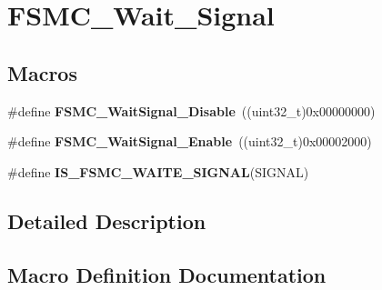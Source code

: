 \hypertarget{group___f_s_m_c___wait___signal}{}\section{F\+S\+M\+C\+\_\+\+Wait\+\_\+\+Signal}
\label{group___f_s_m_c___wait___signal}
\subsection*{Macros}
\begin{DoxyCompactItemize}
\item 
\hypertarget{group___f_s_m_c___wait___signal_ga6ea66c8ddee073281c421533bdff7e19}{}\#define {\bfseries F\+S\+M\+C\+\_\+\+Wait\+Signal\+\_\+\+Disable}~((uint32\+\_\+t)0x00000000)\label{group___f_s_m_c___wait___signal_ga6ea66c8ddee073281c421533bdff7e19}

\item 
\hypertarget{group___f_s_m_c___wait___signal_gaf809e339f1cdc9d0a815fd98712e9ee3}{}\#define {\bfseries F\+S\+M\+C\+\_\+\+Wait\+Signal\+\_\+\+Enable}~((uint32\+\_\+t)0x00002000)\label{group___f_s_m_c___wait___signal_gaf809e339f1cdc9d0a815fd98712e9ee3}

\item 
\#define {\bfseries I\+S\+\_\+\+F\+S\+M\+C\+\_\+\+W\+A\+I\+T\+E\+\_\+\+S\+I\+G\+N\+A\+L}(S\+I\+G\+N\+A\+L)
\end{DoxyCompactItemize}


\subsection{Detailed Description}


\subsection{Macro Definition Documentation}
\hypertarget{group___f_s_m_c___wait___signal_gae617db4f15c82850d4f5c927f9a7db3e}{}

